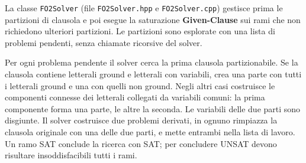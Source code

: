 La classe \texttt{FO2Solver} (file \texttt{FO2Solver.hpp} e \texttt{FO2Solver.cpp}) gestisce prima le partizioni di clausola e poi esegue la saturazione \textbf{Given-Clause} sui rami che non richiedono ulteriori partizioni. Le partizioni sono esplorate con una lista di problemi pendenti, senza chiamate ricorsive del solver.

Per ogni problema pendente il solver cerca la prima clausola partizionabile. Se la clausola contiene letterali ground e letterali con variabili, crea una parte con tutti i letterali ground e una con quelli non ground. Negli altri casi costruisce le componenti connesse dei letterali collegati da variabili comuni: la prima componente forma una parte, le altre la seconda. Le variabili delle due parti sono disgiunte. Il solver costruisce due problemi derivati, in ognuno rimpiazza la clausola originale con una delle due parti, e mette entrambi nella lista di lavoro. Un ramo SAT conclude la ricerca con SAT; per concludere UNSAT devono risultare insoddisfacibili tutti i rami.

